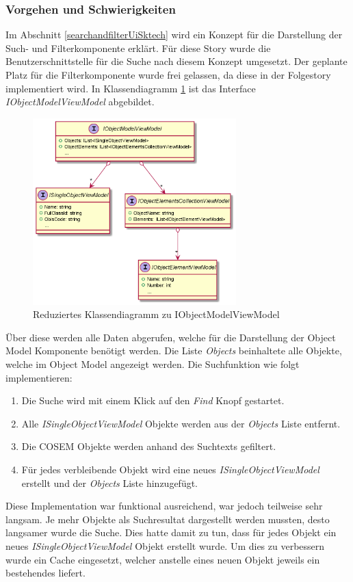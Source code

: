 \subsubsection{Vorgehen und Schwierigkeiten}
Im Abschnitt \ref{searchandfilterUiSktech} wird ein Konzept für die Darstellung der Such- und Filterkomponente erklärt.
Für diese Story wurde die Benutzerschnittstelle für die Suche nach diesem Konzept umgesetzt.
Der geplante Platz für die Filterkomponente wurde frei gelassen, da diese in der Folgestory implementiert wird.
In Klassendiagramm \ref{fig:objectModelVMClassDiagram} ist das Interface \textit{IObjectModelViewModel} abgebildet.
\begin{figure}
   \centering
   \includegraphics[width=0.7\textwidth]{gfx/OMVM.png}
   \caption{
      Reduziertes Klassendiagramm zu IObjectModelViewModel
      }
      \label{fig:objectModelVMClassDiagram}
\end{figure}
Über diese werden alle Daten abgerufen, welche für die Darstellung der Object Model Komponente benötigt werden.
Die Liste \textit{Objects} beinhaltete alle Objekte, welche im Object Model angezeigt werden.
Die Suchfunktion wie folgt implementieren:
\begin{enumerate}
   \item Die Suche wird mit einem Klick auf den \textit{Find} Knopf gestartet.
   \item Alle \textit{ISingleObjectViewModel} Objekte werden aus der \textit{Objects} Liste entfernt.
   \item Die \ac{COSEM} Objekte werden anhand des Suchtexts gefiltert.
   \item Für jedes verbleibende Objekt wird eine neues \textit{ISingleObjectViewModel} erstellt und der \textit{Objects} Liste hinzugefügt.
\end{enumerate} 
Diese Implementation war funktional ausreichend, war jedoch teilweise sehr langsam.
Je mehr Objekte als Suchresultat dargestellt werden mussten, desto langsamer wurde die Suche.
Dies hatte damit zu tun, dass für jedes Objekt ein neues \textit{ISingleObjectViewModel} Objekt erstellt wurde.
Um dies zu verbessern wurde ein Cache eingesetzt, welcher anstelle eines neuen Objekt jeweils ein bestehendes liefert.

